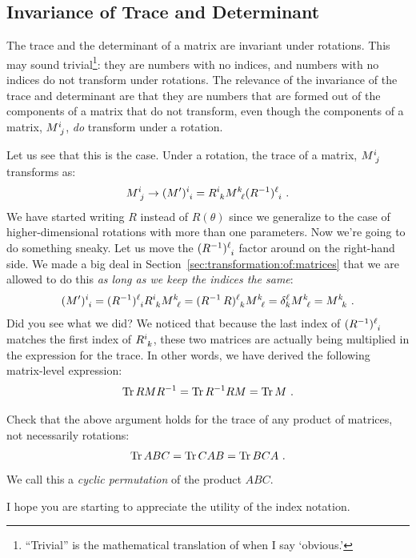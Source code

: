\documentclass[12pt]{article}
\begin{document}
\subsection{Invariance of Trace and Determinant}

The trace and the determinant of a matrix are invariant under rotations. This may sound trivial\footnote{``Trivial'' is the mathematical translation of when I say `obvious.'}: they are numbers with no indices, and numbers with no indices do not transform under rotations. The relevance of the invariance of the trace and determinant are that they are numbers that are formed out of the components of a matrix that do not transform, even though the components of a matrix, $M\aij{i}{j}$, \emph{do} transform under a rotation. 

Let us see that this is the case. Under a rotation, the trace of a matrix, $M\aij{i}{j}$ transforms as:
\begin{align}
    M\aij{i}{j} \to (M')\aij{i}{i} = R\aij{i}{k} M\aij{k}{\ell} (R\inv)\aij{\ell}{i} \ .
\end{align}
We have started writing $R$ instead of $R(\theta)$ since we generalize to the case of higher-dimensional rotations with more than one parameters. Now we're going to do something sneaky. Let us move the $(R\inv)\aij{\ell}{i}$ factor around on the right-hand side. We made a big deal in Section~\ref{sec:transformation:of:matrices} that we are allowed to do this \emph{as long as we keep the indices the same}:
\begin{align}
    (M')\aij{i}{i}
    =
    (R\inv)\aij{\ell}{i} R\aij{i}{k} M\aij{k}{\ell} 
    = (R\inv\, R)\aij{\ell}{k} M\aij{k}{\ell} 
    = \delta^\ell_k M\aij{k}{\ell} 
    = M\aij{k}{k} \ . 
\end{align}
Did you see what we did? We noticed that because the last index of $(R\inv)\aij{\ell}{i}$ matches the first index of $R\aij{i}{k}$, these two matrices are actually being multiplied in the expression for the trace. In other words, we have derived the following matrix-level expression:
\begin{align}
    \textnormal{Tr}\, R M R^{-1} = \textnormal{Tr}\, R^{-1} R M = \textnormal{Tr}\, M \ .
\end{align}
\begin{exercise}
Check that the above argument holds for the trace of any product of matrices, not necessarily rotations:
\begin{align}
    \textnormal{Tr}\, ABC = \textnormal{Tr}\, CAB = \textnormal{Tr}\, BCA \ .
\end{align}
We call this a \emph{cyclic permutation} of the product $ABC$.
\end{exercise}
I hope you are starting to appreciate the utility of the index notation.
\end{document}
